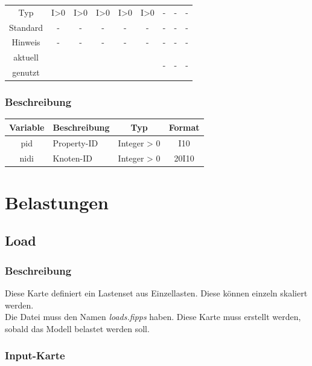 \documentclass[11pt,titlepage,listof=totoc,bibliography=totoc,twoside]{scrreprt}
\begin{document}
{{\begin{table}[htbp]
\begin{tabularx}{\textwidth}{cCCCCCCCC}
Typ             & I>0   & I>0   & I>0   & I>0   & I>0   & -  & -  & -   \\
Standard        & -     & -     & -     & -     & -     & -  & -  & -   \\
Hinweis         & -     & -     & -     & -     & -     & -  & -  & -   \\
aktuell         &  &  &  &  &  &   &   &    \\
genutzt \\
\bottomrule
\end{tabularx}
\end{table}

\subsubsection{Beschreibung}

\begin{tabularx}{\textwidth}{cXcc}
\toprule
Variable  & Beschreibung  & Typ          & Format  \\
\midrule
pid       & Property-ID   & Integer > 0  & I10     \\
nidi      & Knoten-ID     & Integer > 0  & 20I10   \\
\bottomrule
\end{tabularx}

\newpage

\section{Belastungen}

\subsection{Load}

\subsubsection{Beschreibung}

Diese Karte definiert ein Lastenset aus Einzellasten. Diese können einzeln skaliert werden.\\
Die Datei muss den Namen \emph{loads.fipps} haben. Diese Karte muss erstellt werden, sobald das Modell belastet werden soll.

\subsubsection{Input-Karte}

}}
\end{document}
